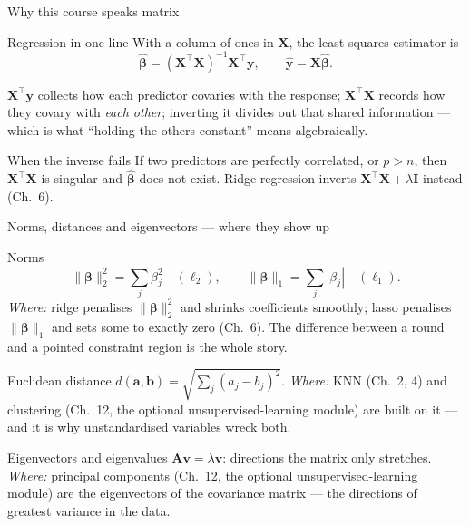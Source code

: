 \documentclass[aspectratio=169,11pt]{beamer}
\begin{document}
\begin{frame}{Why this course speaks matrix}\label{frm:matrix}
  \begin{block}{Regression in one line}
    With a column of ones in $\mathbf{X}$, the least-squares estimator is
    \[
      \hat{\boldsymbol\beta}
      = (\mathbf{X}^\top\mathbf{X})^{-1}\mathbf{X}^\top\mathbf{y},
      \qquad
      \hat{\mathbf{y}} = \mathbf{X}\hat{\boldsymbol\beta}.
    \]
  \end{block}
  \begin{readme}
    $\mathbf{X}^\top\mathbf{y}$ collects how each predictor covaries with the
    response; $\mathbf{X}^\top\mathbf{X}$ records how they covary with
    \emph{each other}; inverting it divides out that shared information ---
    which is what ``holding the others constant'' means algebraically.
  \end{readme}
  \begin{alertblock}{When the inverse fails}
    If two predictors are perfectly correlated, or $p > n$, then
    $\mathbf{X}^\top\mathbf{X}$ is singular and $\hat{\boldsymbol\beta}$ does
    not exist. Ridge regression inverts
    $\mathbf{X}^\top\mathbf{X} + \lambda\mathbf{I}$ instead (Ch.\ 6).
  \end{alertblock}
\end{frame}

\begin{frame}{Norms, distances and eigenvectors --- where they show up}
  \footnotesize
  \begin{block}{Norms}
    \[
      \|\boldsymbol\beta\|_2^2 = \sum_j \beta_j^2 \quad(\ell_2),
      \qquad
      \|\boldsymbol\beta\|_1 = \sum_j |\beta_j| \quad(\ell_1).
    \]
    \emph{Where:} ridge penalises $\|\boldsymbol\beta\|_2^2$ and shrinks
    coefficients smoothly; lasso penalises $\|\boldsymbol\beta\|_1$ and sets
    some to exactly zero (Ch.\ 6). The difference between a round and a
    pointed constraint region is the whole story.
  \end{block}
  \begin{block}{Euclidean distance}
    $d(\mathbf{a},\mathbf{b}) = \sqrt{\sum_j (a_j-b_j)^2}$.
    \emph{Where:} KNN (Ch.\ 2, 4) and clustering (Ch.\ 12, the optional
    unsupervised-learning module) are built on it --- and it is why
    unstandardised variables wreck both.
  \end{block}
  \begin{block}{Eigenvectors and eigenvalues}
    $\mathbf{A}\mathbf{v} = \lambda\mathbf{v}$: directions the matrix only
    stretches. \emph{Where:} principal components (Ch.\ 12, the optional
    unsupervised-learning module) are the eigenvectors of the covariance
    matrix --- the directions of greatest variance in the data.
  \end{block}
\end{frame}
\end{document}
